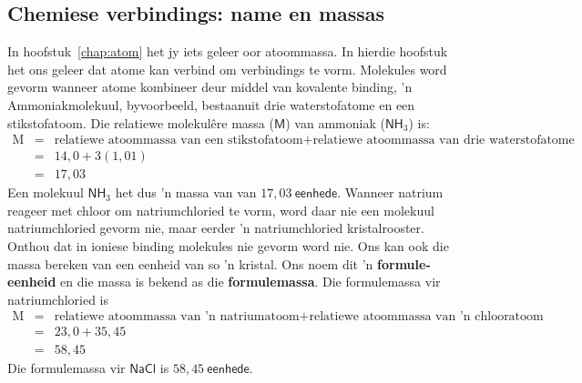             \subsection*{Chemiese verbindings: name en massas}
            \nopagebreak
\label{m38689*uid97124}In hoofstuk~\ref{chap:atom} het jy iets geleer oor atoommassa. In hierdie hoofstuk het ons geleer dat atome kan verbind om verbindings te vorm. Molekules word gevorm wanneer atome kombineer deur middel van kovalente binding, 'n Ammoniakmolekuul, byvoorbeeld, bestaan ​​uit drie waterstofatome en een stikstofatoom. Die relatiewe molekul\^{e}re massa ($\textsf{M}$) van ammoniak ($\textsf{NH}_{3}$) is:\\
\begin{eqnarray*}
 \mbox{M} &=& \mbox{relatiewe atoommassa van een stikstofatoom} + \mbox{relatiewe atoommassa van drie waterstofatome}\\
&= & 14,0 + 3(1,01) \\
&= & 17,03
\end{eqnarray*}
Een molekuul $\textsf{NH}_{3}$ het dus  'n massa van van $17,03~\textsf{eenhede}$. Wanneer natrium reageer met chloor om natriumchloried te vorm, word daar nie een molekuul natriumchloried gevorm nie, maar eerder 'n natriumchloried kristalrooster. Onthou dat in ioniese binding molekules nie gevorm word nie. Ons kan ook die massa bereken van een eenheid van so 'n kristal. Ons noem dit 'n \textbf{formule-eenheid} en die massa is bekend as die \textbf{formulemassa}. Die formulemassa vir natriumchloried is
 \begin{eqnarray*}
 \mbox{M} &= &\mbox{relatiewe atoommassa van 'n natriumatoom} + \mbox{relatiewe atoommassa van 'n chlooratoom}\\
&= & 23,0 + 35,45 \\
&=& 58,45
\end{eqnarray*} 
Die formulemassa vir $\textsf{NaCl}$ is $58,45~\textsf{eenhede}$.
 

